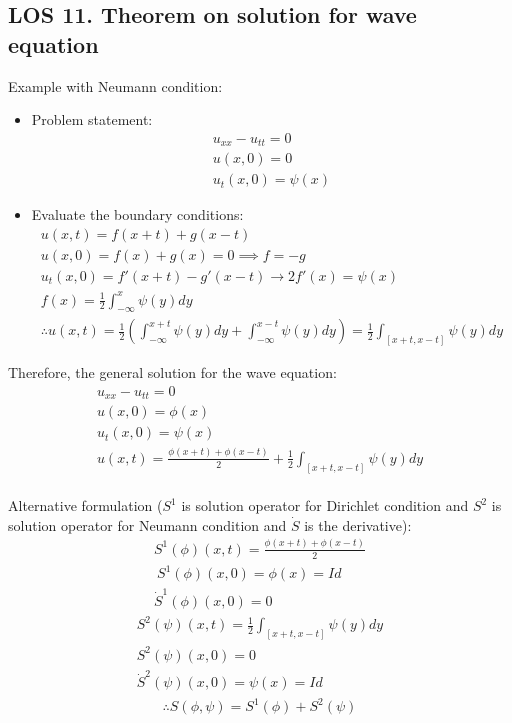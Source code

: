 \documentclass[12pt, a4paper]{article}
\begin{document}
\vspace{0.3em}

\subsection*{LOS 11. Theorem on solution for wave equation}
Example with Neumann condition:
\begin{itemize}
    \item Problem statement:
    \begin{gather*}
        u_{xx} - u_{tt} = 0 \\
        u(x, 0) = 0\\
        u_t(x,0) = \psi(x)
    \end{gather*}
    \item Evaluate the boundary conditions:
    \begin{gather*}
        u(x, t) = f(x+t) + g(x-t) \\
        u(x, 0) = f(x) + g(x) = 0 \implies f = -g\\
        u_t(x, 0) = f'(x+t) - g'(x-t) \rightarrow 2f'(x) = \psi(x) \\
        f(x) = \frac{1}{2} \int_{-\infty}^x \psi(y)dy\\
        \therefore u(x,t) = \frac{1}{2} \left(\int_{-\infty}^{x+t} \psi(y)dy + \int_{-\infty}^{x-t} \psi(y)dy\right) = \frac{1}{2} \int_{[x+t, x-t]}\psi(y)dy
    \end{gather*}
\end{itemize}
Therefore, the general solution for the wave equation:
\begin{gather*}
    u_{xx} - u_{tt} = 0 \\
    u(x, 0) = \phi(x)\\
    u_t(x,0) = \psi(x)\\
    u(x, t) = \frac{\phi(x+t) + \phi(x-t)}{2} + \frac{1}{2} \int_{[x+t, x-t]}\psi(y)dy
\end{gather*} \\
Alternative formulation ($S^1$ is solution operator for Dirichlet condition and $S^2$ is solution operator for Neumann condition and $\dot{S}$ is the derivative):
\begin{gather*}
    S^1(\phi)(x, t) = \frac{\phi(x+t) + \phi(x-t)}{2}\\\
    S^1(\phi)(x, 0) = \phi(x) = Id\\
    \dot{S}^1(\phi)(x, 0) = 0
\end{gather*} 
\begin{gather*}
    S^2(\psi)(x, t) = \frac{1}{2} \int_{[x+t, x-t]}\psi(y)dy\\
    S^2(\psi)(x, 0) = 0\\
    \dot{S}^2(\psi)(x, 0) = \psi(x) = Id
\end{gather*}
\begin{gather*}
    \therefore S(\phi, \psi) = S^1(\phi) + S^2(\psi)
\end{gather*} \\

\vspace{0.3em}
\end{document}
